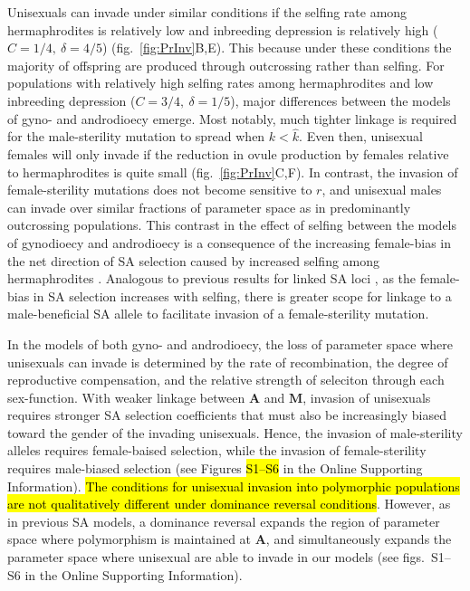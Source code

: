 \documentclass[9pt,twocolumn,twoside,lineno]{gsajnl}
\begin{document}
Unisexuals can invade under similar conditions if the selfing rate among hermaphrodites is relatively low and inbreeding depression is relatively high ($C = 1/4,~\delta = 4/5$) (fig.~\ref{fig:PrInv}B,E). This because under these conditions the majority of offspring are produced through outcrossing rather than selfing. For populations with relatively high selfing rates among hermaphrodites and low inbreeding depression ($C = 3/4,~\delta = 1/5$), major differences between the models of gyno- and androdioecy emerge. Most notably, much tighter linkage is required for the male-sterility mutation to spread when $k < \hat{k}$. Even then, unisexual females will only invade if the reduction in ovule production by females relative to hermaphrodites is quite small (fig.~\ref{fig:PrInv}C,F). In contrast, the invasion of female-sterility mutations does not become sensitive to $r$, and unisexual males can invade over similar fractions of parameter space as in predominantly outcrossing populations. This contrast in the effect of selfing between the models of gynodioecy and androdioecy is a consequence of the increasing female-bias in the net direction of SA selection caused by increased selfing among hermaphrodites \citep{Charlesworth1978a,JordanConnallon2014,Olito2017}. Analogous to previous results for linked SA loci \citep{Olito2017}, as the female-bias in SA selection increases with selfing, there is greater scope for linkage to a male-beneficial SA allele to facilitate invasion of a female-sterility mutation.

In the models of both gyno- and androdioecy, the loss of parameter space where unisexuals can invade is determined by the rate of recombination, the degree of reproductive compensation, and the relative strength of seleciton through each sex-function. With weaker linkage between $\mathbf{A}$ and $\mathbf{M}$, invasion of unisexuals requires stronger SA selection coefficients that must also be increasingly biased toward the gender of the invading unisexuals. Hence, the invasion of male-sterility alleles requires female-baised selection, while the invasion of female-sterility requires male-biased selection (see Figures \hl{S1--S6} in the Online Supporting Information). \hl{The conditions for unisexual invasion into polymorphic populations are not qualitatively different under dominance reversal conditions}. However, as in previous SA models, a dominance reversal expands the region of parameter space where polymorphism is maintained at $\mathbf{A}$, and simultaneously expands the parameter space where unisexual are able to invade in our models (see figs.~S1--S6 in the Online Supporting Information).
\end{document}

